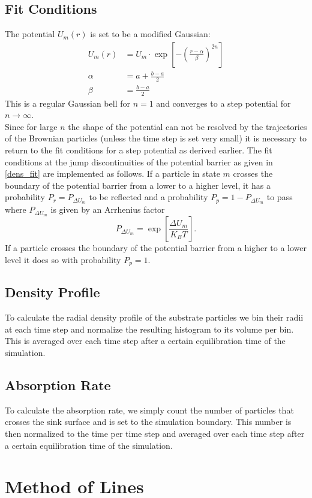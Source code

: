 \subsection{Fit Conditions}
The potential $U_m(r)$ is set to be a modified Gaussian:
\begin{align}
    U_m(r) &= U_m \cdot \exp \left[-\left( \frac{r-\alpha}{\beta} \right)^{2n}\right] \nonumber \\
    \alpha &= a + \frac{b-a}{2} \nonumber \\
    \beta  &= \frac{b-a}{2}
    \label{mod_gauss}
\end{align}
This is a regular Gaussian bell for $n=1$ and converges to a step potential for $n\rightarrow \infty$. \\
Since for large $n$ the shape of the potential can not be resolved by the trajectories of the Brownian particles (unless the time step is set very small) it is necessary to return to the fit conditions for a step potential as derived earlier.
The fit conditions at the jump discontinuities of the potential barrier as given in \eqref{dens_fit} are implemented as follows. If a particle in state $m$ crosses the boundary of the potential barrier from a lower to a higher level, it has a probability $P_r = P_{\Delta U_m}$ to be reflected and a probability $P_p = 1 - P_{\Delta U_m}$ to pass where $P_{\Delta U_m}$ is given by an Arrhenius factor
\begin{equation}
    P_{ \Delta U_m} = \exp \left[\frac{\Delta U_m}{K_B T}  \right].
    \label{arrhenius_factor}
\end{equation}
If a particle crosses the boundary of the potential barrier from a higher to a lower level it does so with probability $P_p = 1$.
\subsection{Density Profile}
To calculate the radial density profile of the substrate particles we bin their radii at each time step and normalize the resulting histogram to its volume per bin. This is averaged over each time step after a certain equilibration time of the simulation.
\subsection{Absorption Rate}
To calculate the absorption rate, we simply count the number of particles that crosses the sink surface and is set to the simulation boundary. This number is then normalized to the time per time step and averaged over each time step after a certain equilibration time of the simulation.
\section{Method of Lines}
\label{method_of_lines}



